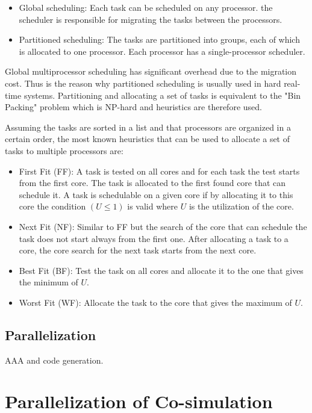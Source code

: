 \begin{itemize}
\item Global scheduling: Each task can be scheduled on any processor. the scheduler is responsible for migrating the tasks between the processors.
\item Partitioned scheduling: The tasks are partitioned into groups, each of which is allocated to one processor. Each processor has a single-processor scheduler. 
\end{itemize}
Global multiprocessor scheduling has significant overhead due to the migration cost. Thus is the reason why partitioned scheduling is usually used in hard real-time systems. Partitioning and allocating a set of tasks is equivalent to the "Bin Packing" problem which is NP-hard and heuristics are therefore used. 

Assuming the tasks are sorted in a list and that processors are organized in a certain order, the most known heuristics that can be used to allocate a set of tasks to multiple processors are:

\begin{itemize}
\item First Fit (FF): A task is tested on all cores and for each task the test starts from the first core. The task is allocated to the first found core that can schedule it. A task is schedulable on a given core if by allocating it to this core the condition $(U\leq1)$ is valid where $U$ is the utilization of the core.
\item Next Fit (NF): Similar to FF but the search of the core that can schedule the task does not start always from the first one. After allocating a task to a core, the core search for the next task starts from the next core.
\item Best Fit (BF): Test the task on all cores and allocate it to the one that gives the minimum of $U$.
\item Worst Fit (WF): Allocate the task to the core that gives the maximum of $U$.
\end{itemize}
  
\subsection{Parallelization}

AAA and code generation.

\section{Parallelization of Co-simulation}

